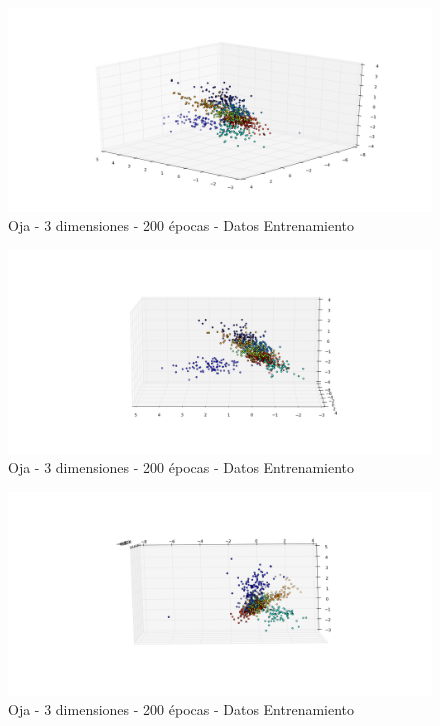 \begin{figure}[h]
  \begin{center}
    \includegraphics[scale=0.4]{../img/ej1/oja/alt-oja_3salida_200ep_train.png}
  \caption{Oja - 3 dimensiones - 200 épocas - Datos Entrenamiento}
  \end{center}
\end{figure}

\begin{figure}[h]
  \begin{center}
    \includegraphics[scale=0.4]{../img/ej1/oja/alt-oja_3salida_200ep_train_2.png}
  \caption{Oja - 3 dimensiones - 200 épocas - Datos Entrenamiento}
  \end{center}
\end{figure}

\begin{figure}[h]
  \begin{center}
    \includegraphics[scale=0.4]{../img/ej1/oja/alt-oja_3salida_200ep_train_3.png}
  \caption{Oja - 3 dimensiones - 200 épocas - Datos Entrenamiento}
  \end{center}
\end{figure}

